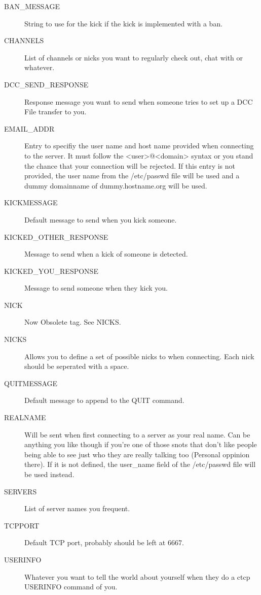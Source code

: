 \documentclass[titlepage]{article}
\begin{document}
\begin{description}
\item[BAN\_MESSAGE]
   String to use for the kick if the kick is implemented with a ban.

\item[CHANNELS]
   List  of  channels  or  nicks you want to regularly check out, chat
   with or whatever.

\item[DCC\_SEND\_RESPONSE]
   Response  message  you  want to send when someone tries to set up a
   DCC File transfer to you.

\item[EMAIL\_ADDR]
   Entry  to  specifiy  the  user  name  and  host  name provided when
   connecting to the server. It must follow the <user>@<domain> syntax
   or  you  stand the chance that your connection will be rejected. If
   this entry is not provided, the user name from the /etc/passwd file
   will  be  used and a dummy domainname of dummy.hostname.org will be
   used.

\item[KICKMESSAGE]
   Default message to send when you kick someone.

\item[KICKED\_OTHER\_RESPONSE]
   Message to send when a kick of someone is detected.

\item[KICKED\_YOU\_RESPONSE]
   Message to send someone when they kick you.

\item[NICK]
   Now Obsolete tag. See NICKS.

\item[NICKS]
   Allows  you  to  define a set of possible nicks to when connecting.
   Each nick should be seperated with a space.

\item[QUITMESSAGE]
   Default message to append to the QUIT command.

\item[REALNAME]
   Will  be  sent when first connecting to a server as your real name.
   Can  be  anything you like though if you're one of those snots that
   don't  like  people  being  able  to  see  just who they are really
   talking  too  (Personal  oppinion there). If it is not defined, the
   user\_name field of the /etc/passwd file will be used instead.

\item[SERVERS]
   List of server names you frequent.

\item[TCPPORT]
   Default TCP port, probably should be left at 6667.

\item[USERINFO]
   Whatever  you  want to tell the world about yourself when they do a
   ctcp USERINFO command of you.
\end{description}
\end{document}
